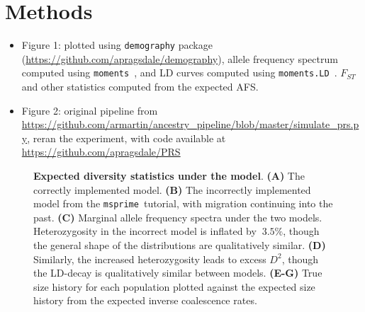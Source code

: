 \documentclass{article}
\newcommand{\msprime}[0]{\texttt{msprime}}
\begin{document}
\section{Methods}

\begin{itemize}
\item Figure 1: plotted using \texttt{demography} package (\url{https://github.com/apragsdale/demography}),
allele frequency spectrum computed using \texttt{moments}~\cite{jouganous2017inferring}, and LD curves
computed using \texttt{moments.LD}~\cite{ragsdale2019models}. $F_{ST}$ and other statistics computed
from the expected AFS.
\item Figure 2: original pipeline from \url{https://github.com/armartin/ancestry_pipeline/blob/master/simulate_prs.py},
reran the experiment, with code available at \url{https://github.com/apragsdale/PRS}
\end{itemize}




\pagebreak

\begin{figure}[ht]
\begin{center}
\caption{\textbf{Expected diversity statistics under the \citet{gutenkunst2009inferring} model}.
    \textbf{(A)} The correctly implemented model.
    \textbf{(B)} The incorrectly implemented model from the \msprime\ tutorial, with migration continuing
    into the past.
    \textbf{(C)} Marginal allele frequency spectra under the two models. Heterozygosity in the incorrect model
    is inflated by $~3.5\%$, though the general shape of the distributions are qualitatively similar.
    \textbf{(D)} Similarly, the increased heterozygosity leads to excess $D^2$, though the LD-decay is
    qualitatively similar between models.
    \textbf{(E-G)} True size history for each population plotted against the expected size history from 
    the expected inverse coalescence rates.
}
\label{fig:ooa_stats}
\end{center}
\end{figure}
\end{document}
